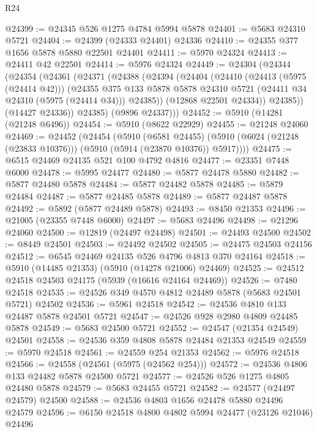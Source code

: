 \begin{lexlean}{R24}
\begin{coremodule}
@24399 := @24345 @526 @1275 @4784 @5994 @5878
@24401 := @5683 @24310 @5721
@24404 := @24399 (@24333 @24401) @24336
@24410 := @24355 @377 @1656 @5878 @5880 @22501 @24401
@24411 := @5970 @24324
@24413 := @24411 @42 @22501
@24414 := @5976 @24324
@24449 := @24304
    (@24344
      (@24354
        (@24361
          (@24371
            (@24388
              (@24394
                (@24404
                  (@24410
                    (@24413 (@5975 (@24414 @42)))
                    (@24355
                      @375
                      @133
                      @5878
                      @5878
                      @24310
                      @5721
                      (@24411 @34 @24310 (@5975 (@24414 @34)))
                      @24385))
                  (@12868 @22501 @24334))
                @24385))
            (@14427 @24336))
          @24385)
        (@9896 @24337)))
@24452 := @5910 (@14281 (@21248 @6496))
@24454 := @5910 (@8622 @22929)
@24455 := @21248 @24060
@24469 := @24452
    (@24454
      (@5910
        (@6581 @24455)
        (@5910 (@6024 (@21248 (@23833 @10376))) (@5910 (@5914 (@23870 @10376)) @5917))))
@24475 := @6515 @24469 @24135 @521 @100 @4792 @4816
@24477 := @23351 @7448 @6000
@24478 := @5995 @24477
@24480 := @5877 @24478 @5880
@24482 := @5877 @24480 @5878
@24484 := @5877 @24482 @5878
@24485 := @5879 @24484
@24487 := @5877 @24485 @5878
@24489 := @5877 @24487 @5878
@24492 := @5892 (@5877 @24489 @5878)
@24493 := @8450 @21353
@24496 := @21005 (@23355 @7448 @6000)
@24497 := @5683 @24496
@24498 := @21296 @24060
@24500 := @12819 (@24497 @24498)
@24501 := @24493 @24500
@24502 := @8449 @24501
@24503 := @24492 @24502
@24505 := @24475 @24503 @24156
@24512 := @6545 @24469 @24135 @526 @4796 @4813 @370 @24164
@24518 := @5910 (@14485 @21353) (@5910 (@14278 @21006) @24469)
@24525 := @24512 @24518 @24503 @24175 (@5939 (@16616 @24164 @24469))
@24526 := @7480 @24518
@24535 := @24526 @349 @4570 @4812 @24489 @5878 (@5683 @24501 @5721) @24502
@24536 := @5961 @24518
@24542 := @24536 @4810 @133 @24487 @5878 @24501 @5721
@24547 := @24526 @928 @2980 @4809 @24485 @5878
@24549 := @5683 @24500 @5721
@24552 := @24547 (@21354 @24549) @24501
@24558 := @24536 @359 @4808 @5878 @24484 @21353 @24549
@24559 := @5970 @24518
@24561 := @24559 @254 @21353
@24562 := @5976 @24518
@24566 := @24558 (@24561 (@5975 (@24562 @254)))
@24572 := @24536 @4806 @133 @24482 @5878 @24500 @5721
@24577 := @24526 @526 @1275 @4805 @24480 @5878
@24579 := @5683 @24455 @5721
@24582 := @24577 (@24497 @24579) @24500
@24588 := @24536 @4803 @1656 @24478 @5880 @24496 @24579
@24596 := @6150 @24518 @4800 @4802 @5994 @24477 (@23126 @21046) @24496

\end{coremodule}
\end{lexlean}
